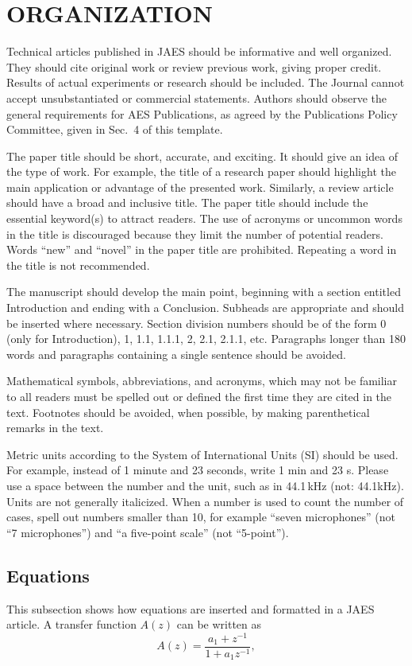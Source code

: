 \documentclass[fleqn]{jaes}
\begin{document}
\section{ORGANIZATION}

Technical articles published in JAES should be informative and well organized. They should cite original work or review previous work, giving proper credit. Results of actual experiments or research should be included. The Journal cannot accept unsubstantiated or commercial statements. Authors should observe the general requirements for AES Publications, as agreed by the Publications Policy Committee, given in Sec.~4 of this template.

The paper title should be short, accurate, and exciting. It should give an idea of the type of work. For example, the title of a research paper should highlight the main application or advantage of the presented work. Similarly, a review article should have a broad and inclusive title. The paper title should include the essential keyword(s) to attract readers. The use of acronyms or uncommon words in the title is discouraged because they limit the number of potential readers. Words “new” and “novel” in the paper title are prohibited. Repeating a word in the title is not recommended.

The manuscript should develop the main point, beginning with a section entitled Introduction and ending with a Conclusion. Subheads are appropriate and should be inserted where necessary. Section division numbers should be of the form 0 (only for Introduction), 1, 1.1, 1.1.1, 2, 2.1, 2.1.1, etc. Paragraphs longer than 180 words and paragraphs containing a single sentence should be avoided.

Mathematical symbols, abbreviations, and acronyms, which may not be familiar to all readers must be spelled out or defined the first time they are cited in the text. Footnotes should be avoided, when possible, by making parenthetical remarks in the text.

Metric units according to the System of International Units (SI) should be used. For example, instead of 1 minute and 23 seconds, write 1 min and 23 s. Please use a space between the number and the unit, such as in 44.1\,kHz (not: 44.1kHz). Units are not generally italicized. When a number is used to count the number of cases, spell out numbers smaller than 10, for example “seven microphones” (not “7 microphones”) and “a five-point scale” (not “5-point”). 

\subsection{Equations}
This subsection shows how equations are inserted and formatted in a JAES article. A transfer function $A(z)$ can be written as
\begin{equation}
A(z) = \frac{{a_1  + z^{ - 1} }}{{1 + a_1 z^{ - 1} }},
\label{eq:transfer_function}
\end{equation}
\end{document}
